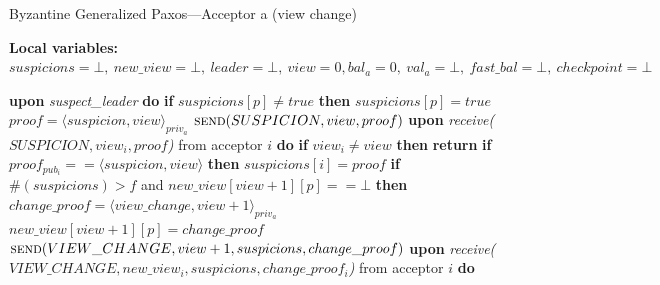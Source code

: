 \documentclass[algorithms,article,accept,moreauthors,pdftex,10pt,a4paper]{Definitions/mdpi}
\begin{document}
\begin{algorithm}[H] 
\small
\caption{Byzantine Generalized Paxos---Acceptor a (view change)}
\label{BFT-Proc}
\textbf{Local variables:} $suspicions = \bot,\ new\_view = \bot,\ leader = \bot,\ view = 0, bal_a = 0, \ val_a = \bot,\ fast\_bal = \bot,\ checkpoint=\bot$
\begin{algorithmic}[1] 
\State \textbf{upon} \textit{suspect\_leader} \textbf{do} 
\State\hspace{\algorithmicindent} \textbf{if} $suspicions[p] \neq true$ \textbf{then}
\State\hspace{\algorithmicindent}\hspace{\algorithmicindent} $suspicions[p] = true$
\State\hspace{\algorithmicindent}\hspace{\algorithmicindent} $proof = \langle suspicion, view \rangle_{priv_a}$
\State \hspace{\algorithmicindent}\hspace{\algorithmicindent} $\Call{send}{SUSPICION, view,proof}$
\State
\State \textbf{upon} \textit{receive($SUSPICION, view_i, proof$)} from acceptor $i$ \textbf{do} 
\State\hspace{\algorithmicindent} \textbf{if} $view_i \neq view$ \textbf{then}
\State\hspace{\algorithmicindent}\hspace{\algorithmicindent} \textbf{return}
\State\hspace{\algorithmicindent} \textbf{if} $proof_{pub_i} == \langle suspicion, view \rangle$ \textbf{then}
\State\hspace{\algorithmicindent}\hspace{\algorithmicindent} $suspicions[i] = proof$
\State\hspace{\algorithmicindent} \textbf{if} $\#(suspicions) > f$ and $new\_view[view+1][p] == \bot$ \textbf{then}
\State\hspace{\algorithmicindent}\hspace{\algorithmicindent} $change\_proof = \langle view\_change, view +1 \rangle_{priv_a}$
\State\hspace{\algorithmicindent}\hspace{\algorithmicindent} $new\_view[view+1][p] = change\_proof$
\State\hspace{\algorithmicindent}\hspace{\algorithmicindent} $\Call{send}{VIEW\_CHANGE, view+1, suspicions, change\_proof}$
\State
\State\textbf{upon} \textit{receive($VIEW\_CHANGE, new\_view_i, suspicions, change\_proof_i$)} from acceptor $i$ \textbf{do} 

\end{algorithmic}
\end{algorithm}
\end{document}
